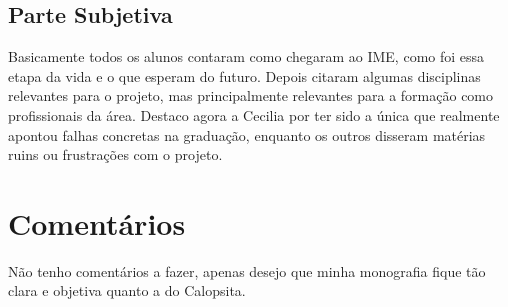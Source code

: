 \documentclass[12pt,a4paper]{article}
\begin{document}
\subsection{Parte Subjetiva}
Basicamente todos os alunos contaram como chegaram ao IME, como foi essa etapa da vida e o que esperam do futuro. Depois citaram algumas disciplinas relevantes para o projeto, mas principalmente relevantes para a formação como profissionais da área. Destaco agora a Cecilia por ter sido a única que realmente apontou falhas concretas na graduação, enquanto os outros disseram matérias ruins ou frustrações com o projeto.

\section{Comentários}
Não tenho comentários a fazer, apenas desejo que minha monografia fique tão clara e objetiva quanto a do Calopsita.
\end{document}
